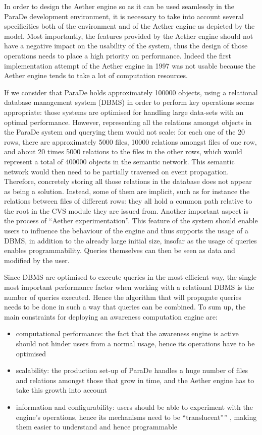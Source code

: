 \documentclass{ecscw2007}
\begin{document}
In order to design the Aether engine so as it can be used seamlessly in the ParaDe development environment, it is necessary to take into account several specificities both of the environment and of the Aether engine as depicted by the model.
Most importantly, the features provided by the Aether engine should not have a negative impact on the usability of the system, thus the design of those operations needs to place a high priority on performance. Indeed the first implementation attempt of the Aether engine in 1997 was not usable because the Aether engine tends to take a lot of computation resources.

If we consider that ParaDe holds approximately 100000 objects, using a relational database management system (DBMS) in order to perform key operations seems appropriate: those systems are optimised for handling large data-sets with an optimal performance. However, representing all the relations amongst objects in the ParaDe system and querying them would not scale: for each one of the 20 rows, there are approximately 5000 files, 10000 relations amongst files of one row, and about 20 times 5000 relations to the files in the other rows, which would represent a total of 400000 objects in the semantic network. This semantic network would then need to be partially traversed on event propagation. Therefore, concretely storing all those relations in the database does not appear as being a solution. Instead, some of them are implicit, such as for instance the relations between files of different rows: they all hold a common path relative to the root in the CVS module they are issued from.
Another important aspect is the process of ``Aether experimentation''. This feature of the system should enable users to influence the behaviour of the engine and thus supports the usage of a DBMS, in addition to the already large initial size, insofar as the usage of queries enables programmability. Queries themselves can then be seen as data and modified by the user.

Since DBMS are optimised to execute queries in the most efficient way, the single most important performance factor when working with a relational DBMS is the number of queries executed. Hence the algorithm that will propagate queries needs to be done in such a way that queries can be combined.
To sum up, the main constraints for deploying an awareness computation engine are:
\begin{itemize}
     \item computational performance: the fact that the awareness engine is active should not hinder users from a normal usage, hence its operations have to be optimised
     \item scalability: the production set-up of ParaDe handles a huge number of files and relations amongst those that grow in time, and the Aether engine has to take this growth into account
     \item information and configurability: users should be able to experiment with the engine’s operations, hence its mechanisms need to be ``translucent'''' , making them easier to understand and hence programmable
\end{itemize}
\end{document}
